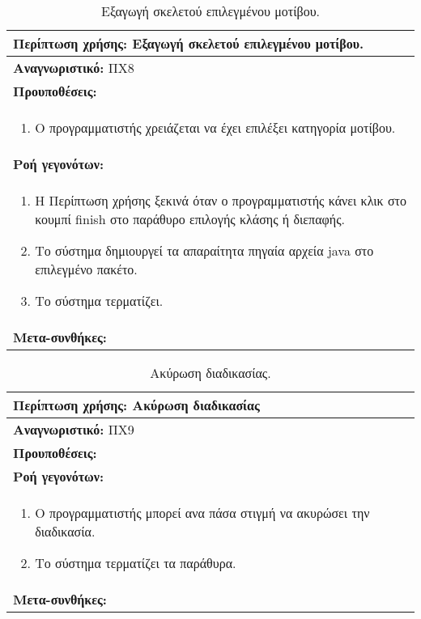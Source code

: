 \begin{table}[H]
	\hspace*{-0.2cm}
    \centering
    \scriptsize
	\begin{tabular}{|p{10cm}|}
	\hline
		\textbf{Περίπτωση χρήσης:} Εξαγωγή σκελετού επιλεγμένου μοτίβου. \\
	\hline
		\textbf{Αναγνωριστικό:} ΠΧ8 \\ 
	\hline	
		\textbf{Προυποθέσεις:} \\
		\begin{enumerate}
		 \item Ο προγραμματιστής χρειάζεται να έχει επιλέξει κατηγορία μοτίβου.
		\end{enumerate} \\
	\hline
		\textbf{Ροή γεγονότων:} \\
		\begin{enumerate}
		 \item Η Περίπτωση χρήσης ξεκινά όταν ο προγραμματιστής κάνει κλικ στο κουμπί finish στο παράθυρο επιλογής κλάσης ή διεπαφής.
		 \item Το σύστημα δημιουργεί τα απαραίτητα πηγαία αρχεία java στο επιλεγμένο πακέτο.
		 \item Το σύστημα τερματίζει.
		\end{enumerate} \\
	\hline
		\textbf{Μετα-συνθήκες:} \\
	\hline
    \end{tabular}
    \caption{Εξαγωγή σκελετού επιλεγμένου μοτίβου.}
    \label{tab:createPatternUC}
\end{table}
\begin{table}[H]
	\hspace*{-0.2cm}
    \centering
    \scriptsize
	\begin{tabular}{|p{10cm}|}
	\hline
		\textbf{Περίπτωση χρήσης:} Ακύρωση διαδικασίας \\
	\hline
		\textbf{Αναγνωριστικό:} ΠΧ9 \\
	\hline	
		\textbf{Προυποθέσεις:} \\
	\hline
		\textbf{Ροή γεγονότων:} \\
		\begin{enumerate}
		 \item Ο προγραμματιστής μπορεί ανα πάσα στιγμή να ακυρώσει την διαδικασία.
 		 \item Το σύστημα τερματίζει τα παράθυρα.
		\end{enumerate} \\
	\hline
		\textbf{Μετα-συνθήκες:} \\
	\hline
    \end{tabular}
    \caption{Ακύρωση διαδικασίας.}
    \label{tab:cancelUC}
\end{table}
